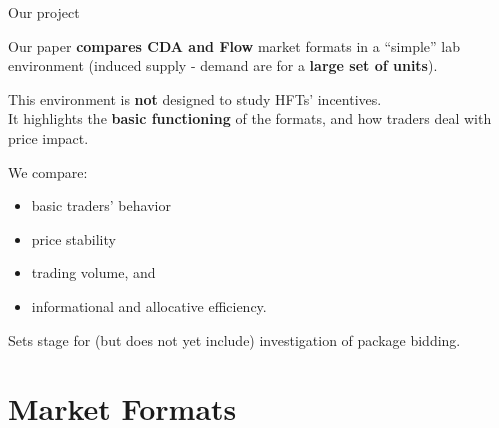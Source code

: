 \documentclass[10pt]{beamer}
\begin{document}

\begin{frame}{Our project}

Our paper \textbf{compares CDA and Flow} market formats in a ``simple'' lab environment (induced supply - demand are for a \textbf{large set of units}). 

This environment is \textbf{not} designed to study HFTs' incentives. \\ 

It highlights the \textbf{basic functioning} of the formats, and how traders deal with price impact. 

We compare:
\begin{itemize}
\item basic traders' behavior %
\item price stability %
\item trading volume, and %
\item informational and allocative efficiency. 
\end{itemize} 

Sets stage for (but does not yet include) investigation of package bidding.

\end{frame}

\section{Market Formats}
\end{document}
